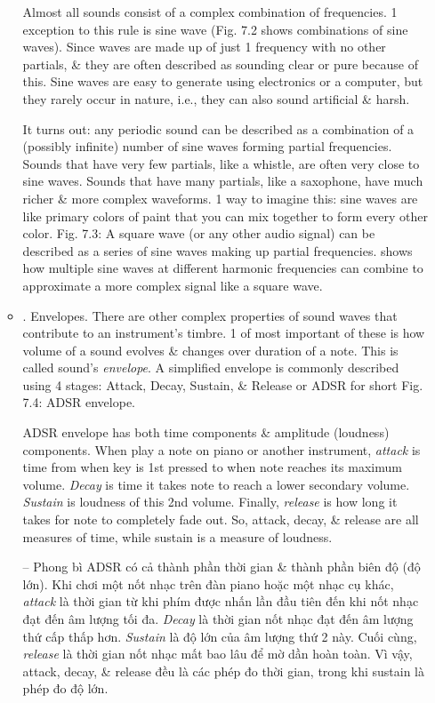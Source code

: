 \documentclass{article}
\begin{document}
\begin{itemize}
\begin{itemize}
		Almost all sounds consist of a complex combination of frequencies. 1 exception to this rule is sine wave ({\sf Fig. 7.2} shows combinations of sine waves). Since waves are made up of just 1 frequency with no other partials, \& they are often described as sounding clear or pure because of this. Sine waves are easy to generate using electronics or a computer, but they rarely occur in nature, i.e., they can also sound artificial \& harsh.
		
		It turns out: any periodic sound can be described as a combination of a (possibly infinite) number of sine waves forming partial frequencies. Sounds that have very few partials, like a whistle, are often very close to sine waves. Sounds that have many partials, like a saxophone, have much richer \& more complex waveforms. 1 way to imagine this: sine waves are like primary colors of paint that you can mix together to form every other color. {\sf Fig. 7.3: A square wave (or any other audio signal) can be described as a series of sine waves making up partial frequencies.} shows how multiple sine waves at different harmonic frequencies can combine to approximate a more complex signal like a square wave.
		\item {. Envelopes.} There are other complex properties of sound waves that contribute to an instrument's timbre. 1 of most important of these is how volume of a sound evolves \& changes over duration of a note. This is called sound's {\it envelope}. A simplified envelope is commonly described using 4 stages: Attack, Decay, Sustain, \& Release or ADSR for short {\sf Fig. 7.4: ADSR envelope}.
		
		ADSR envelope has both time components \& amplitude (loudness) components. When play a note on piano or another instrument, {\it attack} is time from when key is 1st pressed to when note reaches its maximum volume. {\it Decay} is time it takes note to reach a lower secondary volume. {\it Sustain} is loudness of this 2nd volume. Finally, {\it release} is how long it takes for note to completely fade out. So, attack, decay, \& release are all measures of time, while sustain is a measure of loudness.

		-- Phong bì ADSR có cả thành phần thời gian \& thành phần biên độ (độ lớn). Khi chơi một nốt nhạc trên đàn piano hoặc một nhạc cụ khác, {\it attack} là thời gian từ khi phím được nhấn lần đầu tiên đến khi nốt nhạc đạt đến âm lượng tối đa. {\it Decay} là thời gian nốt nhạc đạt đến âm lượng thứ cấp thấp hơn. {\it Sustain} là độ lớn của âm lượng thứ 2 này. Cuối cùng, {\it release} là thời gian nốt nhạc mất bao lâu để mờ dần hoàn toàn. Vì vậy, attack, decay, \& release đều là các phép đo thời gian, trong khi sustain là phép đo độ lớn.
			

\end{itemize}
\end{itemize}
\end{document}
